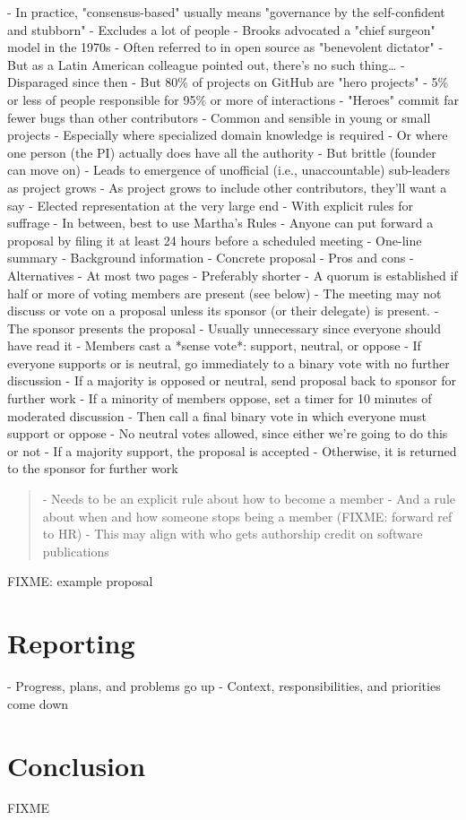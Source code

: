 \documentclass[10pt,letterpaper]{article}
\begin{document}
\begin{markdown}
- In practice, "consensus-based" usually means "governance by the self-confident and stubborn"
  - Excludes a lot of people
- Brooks advocated a "chief surgeon" model in the 1970s \cite{Brooks1995}
  - Often referred to in open source as "benevolent dictator"
  - But as a Latin American colleague pointed out, there's no such thing{\ldots}
- Disparaged since then
  - But 80\% of projects on GitHub are "hero projects" \cite{Majumder2019}
  - 5\% or less of people responsible for 95\% or more of interactions
  - "Heroes" commit far fewer bugs than other contributors
- Common and sensible in young or small projects
  - Especially where specialized domain knowledge is required
  - Or where one person (the PI) actually does have all the authority
  - But brittle (founder can move on)
  - Leads to emergence of unofficial (i.e., unaccountable) sub-leaders as project grows
  - As project grows to include other contributors, they'll want a say
- Elected representation at the very large end
  - With explicit rules for suffrage
- In between, best to use Martha's Rules \cite{Minahan1986}
- Anyone can put forward a proposal by filing it at least 24 hours before a scheduled meeting
  - One-line summary
  - Background information
  - Concrete proposal
  - Pros and cons
  - Alternatives
- At most two pages
  - Preferably shorter
- A quorum is established if half or more of voting members are present (see below)
- The meeting may not discuss or vote on a proposal unless its sponsor (or their delegate) is present.
- The sponsor presents the proposal
  - Usually unnecessary since everyone should have read it
- Members cast a *sense vote*: support, neutral, or oppose
  - If everyone supports or is neutral, go immediately to a binary vote with no further discussion
  - If a majority is opposed or neutral, send proposal back to sponsor for further work
- If a minority of members oppose, set a timer for 10 minutes of moderated discussion
- Then call a final binary vote in which everyone must support or oppose
  - No neutral votes allowed, since either we're going to do this or not
- If a majority support, the proposal is accepted
  - Otherwise, it is returned to the sponsor for further work

\begin{quotation}
- Needs to be an explicit rule about how to become a member
  - And a rule about when and how someone stops being a member (FIXME: forward ref to HR)
- This may align with who gets authorship credit on software publications
\end{quotation}

FIXME: example proposal

\end{markdown}

\section{Reporting}

\begin{markdown}

- Progress, plans, and problems go up
- Context, responsibilities, and priorities come down

\end{markdown}

\section*{Conclusion}

FIXME

\nocite{*}

\end{document}
